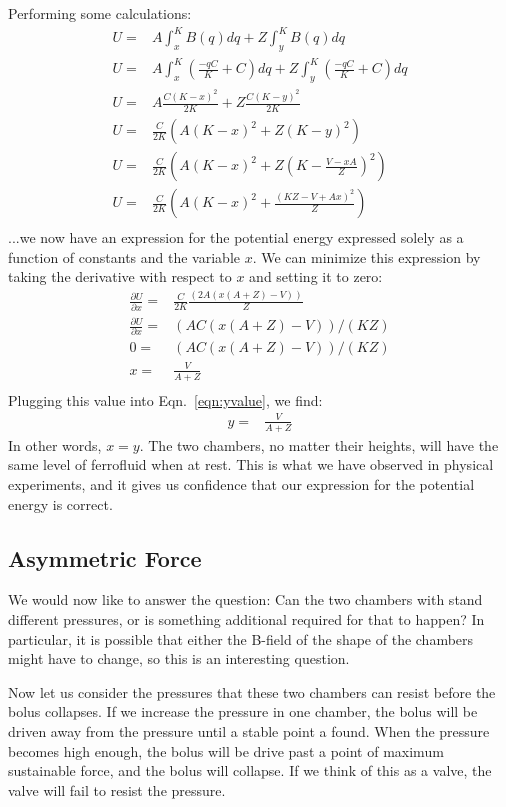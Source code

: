 \documentclass{asme2ej}
\begin{document}
Performing some calculations:
\begin{align}
  U = &A \int_x^K B(q) dq + Z \int_y^K B(q) dq \\
  U = &A \int_x^K (\frac{-qC}{K} + C) dq + Z \int_y^K (\frac{-qC}{K} + C) dq \\
  U = &A \frac{C (K - x)^2}{2 K} + Z \frac{C (K - y)^2}{2 K} \\
  U = & \frac{C}{2K} \left( A  (K - x)^2 + Z (K - y)^2 \right) \\
  U = & \frac{C}{2K} \left( A  (K - x)^2 + Z (K - \frac{V - xA}{Z})^2 \right) \\
  U = & \frac{C}{2K} \left( A  (K - x)^2 + \frac{(K Z - V + A x)^2}{Z} \right) \\
\end{align}
...we now have an expression for the potential energy expressed solely as a function of constants
and the variable $x$. We can minimize this expression by taking the derivative with respect
to $x$ and setting it to zero:
\begin{align}
  \frac{\partial U}{\partial x} = & \frac{C}{2K} \frac{(2 A (x (A + Z) - V))}{Z} \\
  \frac{\partial U}{\partial x} = & (A C (x (A + Z) - V))/(K Z) \\
  0 = &  (A C (x (A + Z) - V))/(K Z)\\
  x = & \frac{V}{A + Z} \\
\end{align}
Plugging this value into Eqn.~\ref{eqn:yvalue}, we find:
\begin{align}
  y = & \frac{V}{A + Z}
\end{align}
In other words, $x = y$. The two chambers, no matter their heights, will have
the same level of ferrofluid when at rest. This is what we have observed in
physical experiments, and it gives us confidence that our expression for the
potential energy is correct.

\subsection{Asymmetric Force}

We would now like to answer the question: Can the two chambers with stand
different pressures, or is something additional required for that to happen?
In particular, it is possible that either the B-field of the shape of the chambers
might have to change, so this is an interesting question.

Now let us consider the pressures that these two chambers can resist before
the bolus collapses. If we increase the pressure in one chamber, the
bolus will be driven away from the pressure until a stable point a found.
When the pressure becomes high enough, the bolus will be drive past a point
of maximum sustainable force, and the bolus will collapse. If we think
of this as a valve, the valve will fail to resist the pressure.
\end{document}
